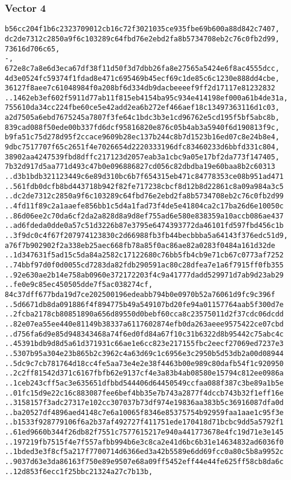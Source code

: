 \documentclass[
]{article}
\begin{document}
\hypertarget{vector-4-2}{%
\subsubsection{Vector 4}\label{vector-4-2}}

\begin{verbatim}
b56cc204f1b6c2323709012cb16c72f3021035ce935fbe69b600a88d842c7407,
dc2de7312c2850a9f6c103289c64fbd76e2ebd2fa8b5734708eb2c76c0fb2d99,
73616d706c65,
-,
672e8c7a8e6d3eca67df38f11d50f3d7dbb26fa8e27565a5424e6f8ac4555dcc,
4d3e0524fc59374f1fdad8e471c695469b45ecf69c1de85c6c1230e888dd4cbe,
36127f8aee7c61048984f0a208bf6d334db9dacbeeeef9ff2d17117e81232832
..1462eb3ef602f5911d77ab11f815eb4154ba95c934e414198ef000a61b4de31a,
755610da34cc224fbe60ce5e42add2ea6b272ef466aef18c13497363116d1c03,
a2d7505a6ebd7675245a7807f3fe64c1bdc3b3e1cd96762e5cd195f5bf5abc8b,
839cad088f50ede00b337fd6dcf95816820e876c05b4ab3a5940f6d190813f9c,
b9fa51c75d278d95f2ccace9609b28ec137b244c8b7d1523b16ed07c8e24b8e4,
9dbc7517707f65c2651f4e7026654d2220333196dfc83460233d6bbfd331c804,
38902aa4247539fbd8dffc217123d2057eab3a1cbc9a05e17bf2da773f147405,
7b32d917d5aa771d493c47b0e096886827cd056c82dbdba19e60baa8b2c60313
..d3b1bdb321123449c6e89d310bc6b7f654315eb471c84778353ce08b951ad471
..561fdb0dcfb8bd443718b942f82fe717238cbcf8d12b8d22861c8a09a984a3c5
..dc2de7312c2850a9f6c103289c64fbd76e2ebd2fa8b5734708eb2c76c0fb2d99
..4fd11f89c2a1aaefe856bb1c5d4a1fad73f4de5e41804ca2c17ba26d6e10050c
..86d06ee2c70da6cf2da2a828d8a9d8ef755ad6e580e838359a10accb086ae437
..ad6fdeda0dde0a57c51d3226b87e3795e6474393772da46101fd597fbd456c1b
..3f9dc0c4f67f207974123830c2d66988fb3fb44becbbba5a64143f376edc51d9,
a76f7b902902f2a338eb25aec668fb78a85f0ac86ae82a0283f0484a161d32de
..1d347631f5ad15c5da84a2582c17122680c76bb5fb4cb9e71cb67c0773af7252
..74bbf97d0f0d0055cd7283da82fdb290591ac80c28dfea7e1a6f7915ff0fb355
..92e630ae2b14e758ab0960e372172203f4c9a41777dadd529971d7ab9d23ab29
..fe0e9c85ec450505dde7f5ac038274cf,
84c37dff677bda19d7ce202500196edeabb794b0e0970b52a76061d9fc9c396f
..5d6671db8da091886f4f894775b49a549107bd20fe94a01157764aab5f300d7e
..2fcba2178cb80851890a656d89550d0bebf60cca8c23575011d2f37cdc06dcdd
..82e07ea55ee440e81149b38337a6117602874efb0da263aeee9575422ce07cbd
..d756fa6d9e85d948343468a74f6ed0fd84a67f10c31b6322d8b95442c75abc4c
..45391bdb9d8d5a61d371931c66ae1e6cc823e217155fbc2eecf27069ed7237e3
..5307b95a304e23b865b2c3962c4a63d69c1c6956e3c2950b5d53db2a00d08944
..5dc9c7cb781764d18cc4fe5aa73e4e2e38f4463b00e989c80dafb54f1c920950
..2c2ff81542d371c6167fbfb62e9137cf4e3a83b4ab08580e15794c812ee0986a
..1ceb243cff5ac3e635651dfbbd544406d64450549ccfaa088f387c3be89a1b5e
..01fc15d9e22c16c883087fee6bef4bb35e7b743a2877f4dccb743b32f1eff16e
..3158157f3adc27317e102cc307037b73df974e19836aa383b5c36916087dfa0d
..ba20527df4896aed4148c7e6a10065f8346e85375754b92959faa1aae1c95f3e
..b1533f928779106f6a2b37af492727f411751ede170418d71bcbc9dd5a5792f1
..61ed9660b344f26db82f7551c7577615217e940a441773678e4fc19d71e3e145
..197219fb7515f4e7f557afbb994b6e3c8ca2e41d6bc6b31e14634832ad6036f0
..1bded3e3f8cf5a217f7700714d6366ed3a42b5589e6dd69fcc0a80c5b8a9952c
..9037d63e3da86163f750e89e9507e68a09ff5452eff44e44fe625ff58cb8da6c
..12d853f6ecc1f25bbc21324a27c7b13b,
\end{verbatim}
\end{document}
